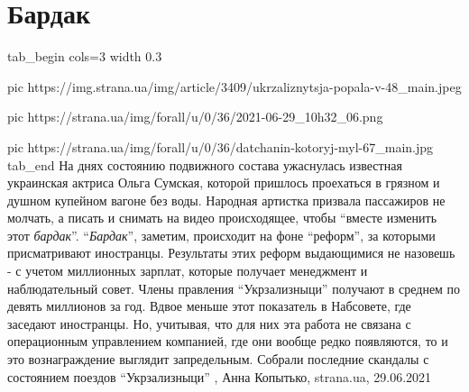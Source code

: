  
 
 
 
 
\chapter{Бардак}
\label{sec:slova.bardak}

\ifcmt
tab_begin cols=3
	width 0.3

  pic https://img.strana.ua/img/article/3409/ukrzaliznytsja-popala-v-48_main.jpeg

	pic https://strana.ua/img/forall/u/0/36/2021-06-29_10h32_06.png

	pic https://strana.ua/img/forall/u/0/36/datchanin-kotoryj-myl-67_main.jpg
tab_end
\fi
На днях состоянию подвижного состава ужаснулась известная украинская актриса
Ольга Сумская, которой пришлось проехаться в грязном и душном купейном вагоне
без воды. Народная артистка призвала пассажиров не молчать, а писать и снимать
на видео происходящее, чтобы \enquote{вместе изменить этот \emph{бардак}}.
\enquote{\emph{Бардак}}, заметим, происходит на фоне \enquote{реформ}, за которыми
присматривают иностранцы. Результаты этих реформ выдающимися не назовешь - с
учетом миллионных зарплат, которые получает менеджмент и наблюдательный совет.
Члены правления \enquote{Укрзализныци} получают в среднем по девять миллионов
за год.  Вдвое меньше этот показатель в Набсовете, где заседают иностранцы. Но,
учитывая, что для них эта работа не связана с операционным управлением
компанией, где они вообще редко появляются, то и это вознаграждение выглядит
запредельным.  Собрали последние скандалы с состоянием поездов
\enquote{Укрзализныци}
, 
Анна Копытько, strana.ua, 29.06.2021

